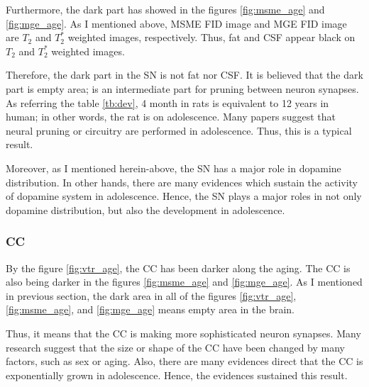 \documentclass[10pt, a4paper]{article}
\begin{document}
				Furthermore, the dark part has showed in the figures \ref{fig:msme_age} and \ref{fig:mge_age}. As I mentioned above, MSME FID image and MGE FID image are $T_2$ and $T_2^*$ weighted images, respectively. Thus, fat and CSF appear black on $T_2$ and $T_2^*$ weighted images.
				
				Therefore, the dark part in the SN is not fat nor CSF. It is believed that the dark part is empty area; is an intermediate part for pruning between neuron synapses. As referring the table \ref{tb:dev}, 4 month in rats is equivalent to 12 years in human; in other words, the rat is on adolescence. Many papers suggest that neural pruning or circuitry are performed in adolescence. \cite{ref:adol1, ref:adol2, ref:adol3} Thus, this is a typical result. 
				
				Moreover, as I mentioned herein-above, the SN has a major role in dopamine distribution. \cite{ref:nigra2, ref:nigra4} In other hands, there are many evidences which sustain the activity of dopamine system in adolescence. \cite{ref:dopa1, ref:dopa2, ref:dopa3} Hence, the SN plays a major roles in not only dopamine distribution, but also the development in adolescence. 
			
			\subsubsection{CC}
				By the figure \ref{fig:vtr_age}, the CC has been darker along the aging. The CC is also being darker in the figures \ref{fig:msme_age} and \ref{fig:mge_age}. As I mentioned in previous section, the dark area in all of the figures \ref{fig:vtr_age}, \ref{fig:msme_age}, and \ref{fig:mge_age} means empty area in the brain. 
				
				Thus, it means that the CC is making more sophisticated neuron synapses. Many research suggest that the size or shape of the CC have been changed by many factors, such as sex or aging. \cite{ref:sex1, ref:age1} Also, there are many evidences direct that the CC is exponentially grown in adolescence. \cite{ref:grow1, ref:grow2} Hence, the evidences sustained this result. 
	
	
	
\end{document}
